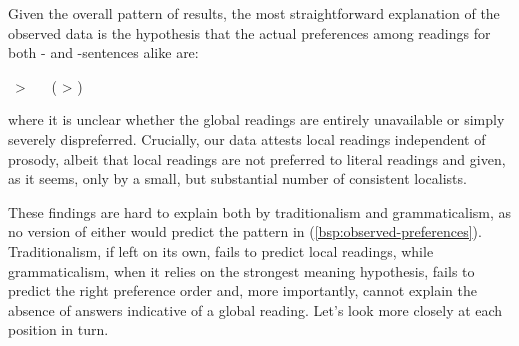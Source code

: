 \documentclass[fleqn,reqno,10pt,draft]{article}
\newcommand{\lit}{\acro{lit}}
\newcommand{\glb}{\acro{glb}}
\newcommand{\loc}{\acro{loc}}
\newcommand{\as}{\acro{as}}
\renewcommand{\es}{\acro{es}}
\begin{document}
Given the overall pattern of results, the most straightforward 
explanation of the observed data is the hypothesis that the actual 
preferences among readings for both \as- and \es-sentences alike are:

\begin{exe}
  \ex \label{bsp:observed-preferences} \lit \ > \ \loc \ \ ( > \glb)
\end{exe}

\noindent where it is unclear whether the global readings are entirely
unavailable or simply severely dispreferred. Crucially, our data
attests local readings independent of prosody, albeit that local
readings are not preferred to literal readings and given, as it seems,
only by a small, but substantial number of consistent localists.

These findings are hard to explain both by traditionalism and
grammaticalism, as no version of either would predict the pattern in
(\ref{bsp:observed-preferences}).  Traditionalism, if left on its own,
fails to predict local readings, while grammaticalism, when it relies
on the strongest meaning hypothesis, fails to predict the right
preference order and, more importantly, cannot explain the absence of
answers indicative of a global reading. Let's look more closely at
each position in turn.
\end{document}
